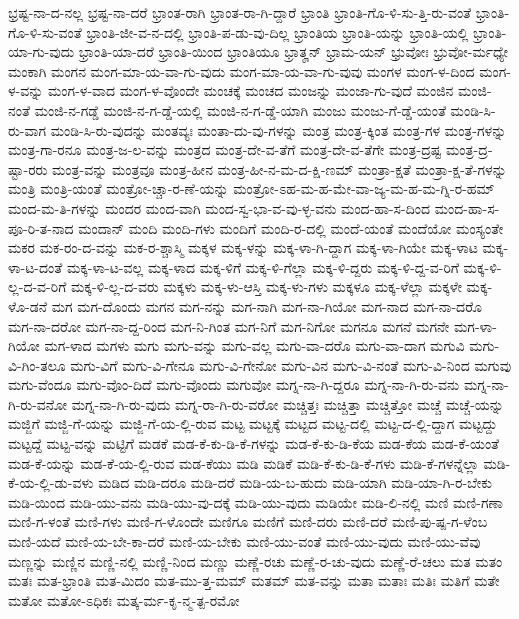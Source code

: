 {ಭ್ರಷ್ಟ-ನಾ-ದ-ನಲ್ಲ
ಭ್ರಷ್ಟ-ನಾ-ದರೆ
ಭ್ರಾಂತ-ರಾಗಿ
ಭ್ರಾಂತ-ರಾ-ಗಿ-ದ್ದಾರೆ
ಭ್ರಾಂತಿ
ಭ್ರಾಂತಿ-ಗೊ-ಳಿ-ಸು-ತ್ತಿ-ರು-ವಂತೆ
ಭ್ರಾಂತಿ-ಗೊ-ಳಿ-ಸು-ವಂತೆ
ಭ್ರಾಂತಿ-ಜೀ-ವ-ನ-ದಲ್ಲಿ
ಭ್ರಾಂತಿ-ಪ-ಡು-ವು-ದಿಲ್ಲ
ಭ್ರಾಂತಿಯ
ಭ್ರಾಂತಿ-ಯನ್ನು
ಭ್ರಾಂತಿ-ಯಲ್ಲಿ
ಭ್ರಾಂತಿ-ಯಾ-ಗು-ವುದು
ಭ್ರಾಂತಿ-ಯಾ-ದರೆ
ಭ್ರಾಂತಿ-ಯಿಂದ
ಭ್ರಾಂತಿಯೂ
ಭ್ರಾತೄನ್
ಭ್ರಾಮ-ಯನ್
ಭ್ರುವೋಃ
ಭ್ರುವೋ-ರ್ಮಧ್ಯೇ
ಮಂಕಾಗಿ
ಮಂಗನ
ಮಂಗ-ಮಾ-ಯ-ವಾ-ಗು-ವುದು
ಮಂಗ-ಮಾ-ಯ-ವಾ-ಗು-ವುವು
ಮಂಗಳ
ಮಂಗ-ಳ-ದಿಂದ
ಮಂಗ-ಳ-ವನ್ನು
ಮಂಗ-ಳ-ವಾದ
ಮಂಗ-ಳ-ವೊಂದೇ
ಮಂಚಕ್ಕೆ
ಮಂಚದ
ಮಂಜನ್ನು
ಮಂಜಾ-ಗು-ವುದೆ
ಮಂಜಿನ
ಮಂಜಿ-ನಂತೆ
ಮಂಜಿ-ನ-ಗಡ್ಡೆ
ಮಂಜಿ-ನ-ಗ-ಡ್ಡೆ-ಯಲ್ಲಿ
ಮಂಜಿ-ನ-ಗ-ಡ್ಡೆ-ಯಾಗಿ
ಮಂಜು
ಮಂಜು-ಗೆ-ಡ್ಡೆ-ಯಂತೆ
ಮಂಡಿ-ಸಿ-ರು-ವಾಗ
ಮಂಡಿ-ಸಿ-ರು-ವುದನ್ನು
ಮಂತವ್ಯಃ
ಮಂತಾ-ದು-ವು-ಗಳನ್ನು
ಮಂತ್ರ
ಮಂತ್ರ-ಕ್ಕಿಂತ
ಮಂತ್ರ-ಗಳ
ಮಂತ್ರ-ಗಳನ್ನು
ಮಂತ್ರ-ಗಾ-ರನೂ
ಮಂತ್ರ-ಜ-ಲ-ವನ್ನು
ಮಂತ್ರದ
ಮಂತ್ರ-ದೇ-ವ-ತೆಗೆ
ಮಂತ್ರ-ದೇ-ವ-ತೆಗೇ
ಮಂತ್ರ-ದ್ರಷ್ಟ
ಮಂತ್ರ-ದ್ರ-ಷ್ಟಾ-ರರು
ಮಂತ್ರ-ವನ್ನು
ಮಂತ್ರವೂ
ಮಂತ್ರ-ಹೀನ
ಮಂತ್ರ-ಹೀ-ನ-ಮ-ದ-ಕ್ಷಿ-ಣಮ್
ಮಂತ್ರಾ-ಕ್ಷತೆ
ಮಂತ್ರಾ-ಕ್ಷ-ತೆ-ಗಳನ್ನು
ಮಂತ್ರಿ
ಮಂತ್ರಿ-ಯಂತೆ
ಮಂತ್ರೋ-ಚ್ಚಾ-ರ-ಣೆ-ಯನ್ನು
ಮಂತ್ರೋ-ಽಹ-ಮ-ಹ-ಮೇ-ವಾ-ಜ್ಯ-ಮ-ಹ-ಮ-ಗ್ನಿ-ರ-ಹಮ್
ಮಂದ-ಮ-ತಿ-ಗಳನ್ನು
ಮಂದರ
ಮಂದ-ವಾಗಿ
ಮಂದ-ಸ್ವ-ಭಾ-ವ-ವು-ಳ್ಳ-ವನು
ಮಂದ-ಹಾ-ಸ-ದಿಂದ
ಮಂದ-ಹಾ-ಸ-ಪೂ-ರಿ-ತ-ನಾದ
ಮಂದಾನ್
ಮಂದಿ
ಮಂದಿ-ಗಳು
ಮಂದಿಗೆ
ಮಂದಿ-ರ-ದಲ್ಲಿ
ಮಂದೆ-ಯಂತೆ
ಮಂದೆಯೋ
ಮಂಸ್ಯಂತೇ
ಮಕರ
ಮಕ-ರಂ-ದ-ವನ್ನು
ಮಕ-ರ-ಶ್ಚಾಸ್ಮಿ
ಮಕ್ಕಳ
ಮಕ್ಕ-ಳನ್ನು
ಮಕ್ಕ-ಳಾ-ಗಿ-ದ್ದಾಗ
ಮಕ್ಕ-ಳಾ-ಗಿಯೇ
ಮಕ್ಕ-ಳಾಟ
ಮಕ್ಕ-ಳಾ-ಟ-ದಂತೆ
ಮಕ್ಕ-ಳಾ-ಟ-ವಲ್ಲ
ಮಕ್ಕ-ಳಾದ
ಮಕ್ಕ-ಳಿಗೆ
ಮಕ್ಕ-ಳಿ-ಗೆಲ್ಲಾ
ಮಕ್ಕ-ಳಿ-ದ್ದರು
ಮಕ್ಕ-ಳಿ-ದ್ದ-ವ-ರಿಗೆ
ಮಕ್ಕ-ಳಿ-ಲ್ಲ-ದ-ವ-ರಿಗೆ
ಮಕ್ಕ-ಳಿ-ಲ್ಲ-ದ-ವರು
ಮಕ್ಕಳು
ಮಕ್ಕ-ಳು-ಆಸ್ತಿ
ಮಕ್ಕ-ಳು-ಗಳು
ಮಕ್ಕಳೂ
ಮಕ್ಕ-ಳೆಲ್ಲಾ
ಮಕ್ಕಳೇ
ಮಕ್ಕ-ಳೊ-ಡನೆ
ಮಗ
ಮಗ-ದೊಂದು
ಮಗನ
ಮಗ-ನನ್ನು
ಮಗ-ನಾಗಿ
ಮಗ-ನಾ-ಗಿಯೋ
ಮಗ-ನಾದ
ಮಗ-ನಾ-ದರೊ
ಮಗ-ನಾ-ದರೋ
ಮಗ-ನಾ-ದ್ದ-ರಿಂದ
ಮಗ-ನಿ-ಗಿಂತ
ಮಗ-ನಿಗೆ
ಮಗ-ನಿಗೋ
ಮಗನೂ
ಮಗನೆ
ಮಗನೇ
ಮಗ-ಳಾ-ಗಿಯೋ
ಮಗ-ಳಾದ
ಮಗಳು
ಮಗು
ಮಗು-ವನ್ನು
ಮಗು-ವಲ್ಲ
ಮಗು-ವಾ-ದರೊ
ಮಗು-ವಾ-ದಾಗ
ಮಗುವಿ
ಮಗು-ವಿ-ಗಿಂ-ತಲೂ
ಮಗು-ವಿಗೆ
ಮಗು-ವಿ-ಗೇನೂ
ಮಗು-ವಿ-ಗೇನೋ
ಮಗು-ವಿನ
ಮಗು-ವಿ-ನಂತೆ
ಮಗು-ವಿ-ನಿಂದ
ಮಗುವು
ಮಗು-ವೆಂದೂ
ಮಗು-ವೊಂ-ದಿದೆ
ಮಗು-ವೊಂದು
ಮಗುವೋ
ಮಗ್ನ-ನಾ-ಗಿ-ದ್ದರೂ
ಮಗ್ನ-ನಾ-ಗಿ-ರು-ವನು
ಮಗ್ನ-ನಾ-ಗಿ-ರು-ವನೋ
ಮಗ್ನ-ನಾ-ಗಿ-ರು-ವುದು
ಮಗ್ನ-ರಾ-ಗಿ-ರು-ವರೋ
ಮಚ್ಚಿತ್ತಃ
ಮಚ್ಚಿತ್ತಾ
ಮಚ್ಚಿತ್ತೋ
ಮಚ್ಚೆ
ಮಚ್ಚೆ-ಯನ್ನು
ಮಜ್ಜಿಗೆ
ಮಜ್ಜಿ-ಗೆ-ಯನ್ನು
ಮಜ್ಜಿ-ಗೆ-ಯ-ಲ್ಲಿ-ರುವ
ಮಟ್ಟ
ಮಟ್ಟಕ್ಕೆ
ಮಟ್ಟದ
ಮಟ್ಟ-ದಲ್ಲಿ
ಮಟ್ಟ-ದ-ಲ್ಲಿ-ದ್ದಾಗ
ಮಟ್ಟದ್ದು
ಮಟ್ಟದ್ದೆ
ಮಟ್ಟ-ವನ್ನು
ಮಟ್ಟಿಗೆ
ಮಡಕೆ
ಮಡ-ಕೆ-ಕು-ಡಿ-ಕೆ-ಗಳನ್ನು
ಮಡ-ಕೆ-ಕು-ಡಿ-ಕೆಯ
ಮಡ-ಕೆಯ
ಮಡ-ಕೆ-ಯಂತೆ
ಮಡ-ಕೆ-ಯನ್ನು
ಮಡ-ಕೆ-ಯ-ಲ್ಲಿ-ರುವ
ಮಡ-ಕೆಯು
ಮಡಿ
ಮಡಿಕೆ
ಮಡಿ-ಕೆ-ಕು-ಡಿ-ಕೆ-ಗಳು
ಮಡಿ-ಕೆ-ಗಳನ್ನೆಲ್ಲಾ
ಮಡಿ-ಕೆ-ಯ-ಲ್ಲಿ-ಡು-ವಳು
ಮಡಿದ
ಮಡಿ-ದರೂ
ಮಡಿ-ದರೆ
ಮಡಿ-ಯ-ಬ-ಹುದು
ಮಡಿ-ಯಾಗಿ
ಮಡಿ-ಯಾ-ಗಿ-ರ-ಬೇಕು
ಮಡಿ-ಯಿಂದ
ಮಡಿ-ಯು-ವನು
ಮಡಿ-ಯು-ವು-ದಕ್ಕೆ
ಮಡಿ-ಯು-ವುದು
ಮಡಿಯೇ
ಮಡಿ-ಲಿ-ನಲ್ಲಿ
ಮಣಿ
ಮಣಿ-ಗಣಾ
ಮಣಿ-ಗ-ಳಂತೆ
ಮಣಿ-ಗಳು
ಮಣಿ-ಗ-ಳೊಂದೇ
ಮಣಿಗೂ
ಮಣಿಗೆ
ಮಣಿ-ದರು
ಮಣಿ-ದರೆ
ಮಣಿ-ಪು-ಷ್ಪ-ಗ-ಳೆಂಬ
ಮಣಿ-ಯದೆ
ಮಣಿ-ಯ-ಬೇ-ಕಾ-ದರೆ
ಮಣಿ-ಯ-ಬೇಕು
ಮಣಿ-ಯು-ವಂತೆ
ಮಣಿ-ಯು-ವುದು
ಮಣಿ-ಯು-ವೆವು
ಮಣ್ಣನ್ನು
ಮಣ್ಣಿನ
ಮಣ್ಣಿ-ನಲ್ಲಿ
ಮಣ್ಣಿ-ನಿಂದ
ಮಣ್ಣು
ಮಣ್ಣೆ-ರಚು
ಮಣ್ಣೆ-ರ-ಚು-ವುದು
ಮಣ್ಣೆ-ರೆ-ಚಲು
ಮತ
ಮತಂ
ಮತಃ
ಮತ-ಭ್ರಾಂತಿ
ಮತ-ಮಿದಂ
ಮತ-ಮು-ತ್ತ-ಮಮ್
ಮತಮ್
ಮತ-ವನ್ನು
ಮತಾ
ಮತಾಃ
ಮತಿಃ
ಮತಿಗೆ
ಮತೇ
ಮತೋ
ಮತೋ-ಽಧಿಕಃ
ಮತ್ಕ-ರ್ಮ-ಕೃ-ನ್ಮ-ತ್ಪ-ರಮೋ
}

